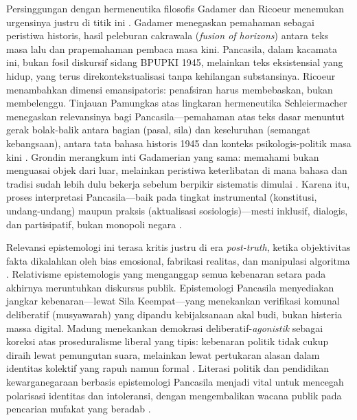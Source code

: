 \documentclass[journal]{IEEEtran}
\begin{document}
Persinggungan dengan hermeneutika filosofis Gadamer dan Ricoeur menemukan urgensinya justru di titik ini \cite{gadamer2004,ricoeur1981}. Gadamer menegaskan pemahaman sebagai peristiwa historis, hasil peleburan cakrawala (\textit{fusion of horizons}) antara teks masa lalu dan prapemahaman pembaca masa kini. Pancasila, dalam kacamata ini, bukan fosil diskursif sidang BPUPKI 1945, melainkan teks eksistensial yang hidup, yang terus direkontekstualisasi tanpa kehilangan substansinya. Ricoeur menambahkan dimensi emansipatoris: penafsiran harus membebaskan, bukan membelenggu. Tinjauan Pamungkas atas lingkaran hermeneutika Schleiermacher menegaskan relevansinya bagi Pancasila---pemahaman atas teks dasar menuntut gerak bolak-balik antara bagian (pasal, sila) dan keseluruhan (semangat kebangsaan), antara tata bahasa historis 1945 dan konteks psikologis-politik masa kini \cite{pamungkas2018}. Grondin merangkum inti Gadamerian yang sama: memahami bukan menguasai objek dari luar, melainkan peristiwa keterlibatan di mana bahasa dan tradisi sudah lebih dulu bekerja sebelum berpikir sistematis dimulai \cite{grondin2021,gadamer2004}. Karena itu, proses interpretasi Pancasila---baik pada tingkat instrumental (konstitusi, undang-undang) maupun praksis (aktualisasi sosiologis)---mesti inklusif, dialogis, dan partisipatif, bukan monopoli negara \cite{madungmere2021,suntana2023}.

Relevansi epistemologi ini terasa kritis justru di era \textit{post-truth}, ketika objektivitas fakta dikalahkan oleh bias emosional, fabrikasi realitas, dan manipulasi algoritma \cite{kurniasih2016,rahmatullah2022}. Relativisme epistemologis yang menganggap semua kebenaran setara pada akhirnya meruntuhkan diskursus publik. Epistemologi Pancasila menyediakan jangkar kebenaran---lewat Sila Keempat---yang menekankan verifikasi komunal deliberatif (musyawarah) yang dipandu kebijaksanaan akal budi, bukan histeria massa digital. Madung menekankan demokrasi deliberatif-\textit{agonistik} sebagai koreksi atas proseduralisme liberal yang tipis: kebenaran politik tidak cukup diraih lewat pemungutan suara, melainkan lewat pertukaran alasan dalam identitas kolektif yang rapuh namun formal \cite{madung2016}. Literasi politik dan pendidikan kewarganegaraan berbasis epistemologi Pancasila menjadi vital untuk mencegah polarisasi identitas dan intoleransi, dengan mengembalikan wacana publik pada pencarian mufakat yang beradab \cite{effend2024,kamalashif2023}.
\end{document}
